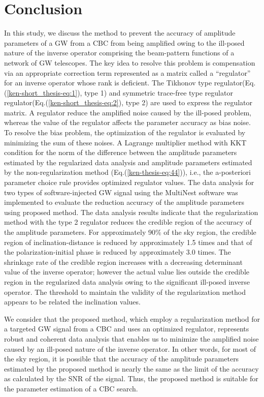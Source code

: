 \documentclass[%
 aps,
 prd,
 amsmath,amssymb,
 reprint,%
superscriptaddress
]{revtex4-1}
\begin{document}
\section{Conclusion}\label{server-thesis-sec:conclusion}
In this study, we discuss the method to prevent the accuracy of amplitude parameters of a GW from a CBC from being amplified owing to the ill-posed nature of the inverse operator comprising the beam-pattern functions of a network of GW telescopes. The key idea to resolve this problem is compensation via an appropriate correction term represented as a matrix called a ``regulator'' for an inverse operator whose rank is deficient. The Tikhonov type regulator(Eq.(\ref{ken-short_thesis-eq:1}), type 1) and symmetric trace-free type regulator regulator(Eq.(\ref{ken-short_thesis-eq:2}), type 2) are used to express the regulator matrix. A regulator reduce the amplified noise caused by the ill-posed problem, whereas the value of the regulator affects the parameter accuracy as bias noise. To resolve the bias problem, the optimization of the regulator is evaluated by minimizing the sum of these noises. A Lagrange multiplier method with KKT condition for the norm of the difference between the amplitude parameters estimated by the regularized data analysis and amplitude parameters estimated by the non-regularization method (Eq.(\ref{ken-thesis-eq:44})), i.e., the a-posteriori parameter choice rule provides optimized regulator values. The data analysis for two types of software-injected GW signal using the MultiNest software was implemented to evaluate the reduction accuracy of the amplitude parameters using proposed method. The data analysis results indicate that the regularization method with the type 2 regulator reduces the credible region of the accuracy of the amplitude parameters. For approximately 90\% of the sky region, the credible region of inclination-distance is reduced by approximately 1.5 times and that of the polarization-initial phase is reduced by approximately 3.0 times. The shrinkage rate of the credible region increases with a decreasing determinant value of the inverse operator; however the actual value lies outside the credible region in the regularized data analysis owing to the significant ill-posed inverse operator. The threshold to maintain the validity of the regularization method appears to be related the inclination values.

We consider that the proposed method, which employ a regularization method for a targeted GW signal from a CBC and uses an optimized regulator, represents robust and coherent data analysis that enables us to minimize the amplified noise caused by an ill-posed nature of the inverse operator. In other words, for most of the sky region, it is possible that the accuracy of the amplitude parameters estimated by the proposed method is nearly the same as the limit of the accuracy as calculated by the SNR of the signal. Thus, the proposed method is suitable for the parameter estimation of a CBC search.
\end{document}
